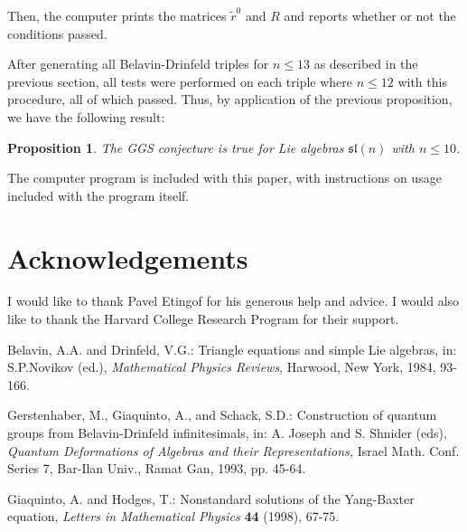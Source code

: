 \documentclass[12pt]{article}
\newtheorem{prop}{Proposition}[section]
\numberwithin{equation}{section}
\begin{document}
Then, the computer prints the matrices $\tilde r^0$ and $R$ and
reports whether or not the conditions passed.  

After generating all Belavin-Drinfeld triples for $n \leq 13$ as
described in the previous section, all tests were performed on each
triple where $n \leq 12$ with this procedure, all of which passed.
Thus, by application of the previous proposition, we have the
following result:

\begin{prop}  
The GGS conjecture is true for Lie algebras $\mathfrak{sl}(n)$ with $n
\leq 10$.
\end{prop}

The computer program is included with this paper, with instructions on
usage included with the program itself.

\section{Acknowledgements}

I would like to thank Pavel Etingof for his generous help and advice.
I would also like to thank the Harvard College Research Program for
their support.

\begin{thebibliography}{VancVanRL}

 Belavin, A.A. and Drinfeld, V.G.: Triangle equations and
simple Lie algebras, in: S.P.Novikov (ed.), {\it Mathematical Physics
Reviews}, Harwood, New York, 1984, 93-166.

 Gerstenhaber, M., Giaquinto, A., and Schack, S.D.:
Construction of quantum groups from Belavin-Drinfeld infinitesimals,
in: A. Joseph and S. Shnider (eds), {\it Quantum Deformations of
Algebras and their Representations,} Israel Math. Conf. Series 7,
Bar-Ilan Univ., Ramat Gan, 1993, pp. 45-64.

 Giaquinto, A. and Hodges, T.: Nonstandard solutions of
the Yang-Baxter equation, {\it Letters in Mathematical Physics} {\bf
44} (1998), 67-75.

\end{thebibliography}
\end{document}

